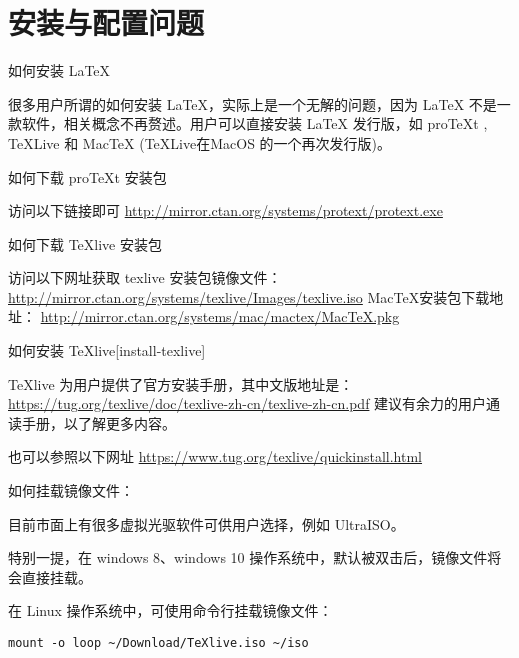 \DeclareRobustCommand\cs[1]{\texttt{\char`\\#1}}
\providecommand\marg[1]{\texttt{\{<#1>\}}}
\providecommand\oarg[1]{\texttt{[<#1>]}}
\providecommand\Arg[1]{\texttt{\{#1\}}}
\providecommand\env{\texttt}
\providecommand\pkg{\textsf}
\providecommand\cls{\textsf}
\providecommand\file{\textsf}



\section{安装与配置问题}

\begin{faq}{如何安装 LaTeX}

很多用户所谓的如何安装 LaTeX，实际上是一个无解的问题，因为 LaTeX
不是一款软件，相关概念不再赘述。用户可以直接安装 LaTeX 发行版，如
proTeXt , TeXLive 和 MacTeX (TeXLive在MacOS 的一个再次发行版)。
\end{faq}


\begin{faq}{如何下载 proTeXt 安装包}

访问以下链接即可
\url{http://mirror.ctan.org/systems/protext/protext.exe}
\end{faq}


\begin{faq}{如何下载 TeXlive 安装包}

访问以下网址获取 texlive 安装包镜像文件：
\url{http://mirror.ctan.org/systems/texlive/Images/texlive.iso}
MacTeX安装包下载地址：
\url{http://mirror.ctan.org/systems/mac/mactex/MacTeX.pkg}
\end{faq}


\begin{faq}{如何安装 TeXlive}[install-texlive]

TeXlive 为用户提供了官方安装手册，其中文版地址是：
\url{https://tug.org/texlive/doc/texlive-zh-cn/texlive-zh-cn.pdf}
建议有余力的用户通读手册，以了解更多内容。

也可以参照以下网址 \url{https://www.tug.org/texlive/quickinstall.html}
\end{faq}


\begin{faq}{如何挂载镜像文件：}

目前市面上有很多虚拟光驱软件可供用户选择，例如 UltraISO。

特别一提，在 windows 8、windows 10
操作系统中，默认被双击后，镜像文件将会直接挂载。

在 Linux 操作系统中，可使用命令行挂载镜像文件：

\begin{verbatim}
mount -o loop ~/Download/TeXlive.iso ~/iso
\end{verbatim}
\end{faq}


